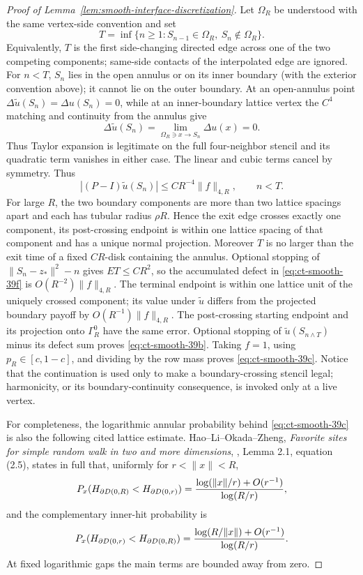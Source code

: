 \begin{proof}[Proof of Lemma~\ref{lem:smooth-interface-discretization}]
Let $\Omega_R$ be understood with the same vertex-side convention and set
\[
T=\inf\{n\ge1:S_{n-1}\in\Omega_R,\ S_n\notin\Omega_R\}.
\]
Equivalently, $T$ is the first side-changing directed edge across one of
the two competing components; same-side contacts of the interpolated edge
are ignored.  For $n<T$, $S_n$ lies in the open annulus or on its inner
boundary (with the exterior convention above); it cannot lie on the outer
boundary.  At an open-annulus point
$\Delta\widetilde u(S_n)=\Delta u(S_n)=0$, while at an inner-boundary
lattice vertex the $C^4$ matching and continuity from the annulus give
\[
\Delta\widetilde u(S_n)
       =\lim_{\Omega_R\ni x\to S_n}\Delta u(x)=0.
\]
Thus Taylor expansion is legitimate on the full four-neighbor stencil and
its quadratic term vanishes in either case.  The linear and cubic terms
cancel by symmetry.
Thus
\begin{equation}
|(P-I)\widetilde u(S_n)|\le CR^{-4}\|f\|_{4,R},
             \qquad n<T.\label{eq:ct-smooth-39f}
\end{equation}
For large $R$, the two boundary components are more than two lattice
spacings apart and each has tubular radius $\rho R$.  Hence the exit edge
crosses exactly one component, its post-crossing endpoint is within one
lattice spacing of that component and has a unique normal projection.
Moreover $T$ is no larger than the exit time of a fixed $CR$-disk
containing the annulus.  Optional stopping of
$\lVert S_n-z_*\rVert^2-n$ gives $ET\le CR^2$, so the accumulated
defect in \eqref{eq:ct-smooth-39f} is $O(R^{-2})\|f\|_{4,R}$.  The terminal endpoint is
within one lattice unit of the uniquely crossed component; its value
under $\widetilde u$ differs from the projected boundary payoff by
$O(R^{-1})\|f\|_{4,R}$.  The post-crossing starting endpoint and its
projection onto $\Gamma_R^0$ have the same error.  Optional stopping of
$\widetilde u(S_{n\wedge T})$ minus its defect sum proves \eqref{eq:ct-smooth-39b}.
Taking $f=1$, using $p_R\in[c,1-c]$, and dividing by the row mass
proves \eqref{eq:ct-smooth-39c}.  Notice that the continuation is used only to make a
boundary-crossing stencil legal; harmonicity, or its boundary-continuity
consequence, is invoked only at a live vertex.

For completeness, the logarithmic annular probability behind \eqref{eq:ct-smooth-39c} is
also the following cited lattice estimate.  Hao--Li--Okada--Zheng,
\emph{Favorite sites for simple random walk in two and more dimensions},
\cite{HLOZ2025}, Lemma 2.1,
equation (2.5), states in full that, uniformly for
$r<\lVert x\rVert<R$,
\[
P_x(H_{\partial D(0,R)}<H_{\partial D(0,r)})
 ={\log(\lVert x\rVert/r)+O(r^{-1})\over\log(R/r)},
\]
and the complementary inner-hit probability is
\[
P_x(H_{\partial D(0,r)}<H_{\partial D(0,R)})
 ={\log(R/\lVert x\rVert)+O(r^{-1})\over\log(R/r)}.
\]
At fixed logarithmic gaps the main terms are bounded away from zero.


\end{proof}
